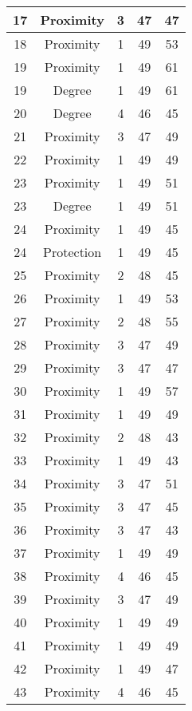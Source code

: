 \documentclass[results.tex]{subfiles}
\begin{document}
\begin{center}
\begin{tabular}{| c || c | c | c | c |}
    17 & Proximity & 3 & 47 & 47 \\ 
    \hline
    18 & Proximity & 1 & 49 & 53 \\ 
    \hline
    19 & Proximity & 1 & 49 & 61 \\ 
    \hline
    19 & Degree & 1 & 49 & 61 \\ 
    \hline
    20 & Degree & 4 & 46 & 45 \\ 
    \hline
    21 & Proximity & 3 & 47 & 49 \\ 
    \hline
    22 & Proximity & 1 & 49 & 49 \\ 
    \hline
    23 & Proximity & 1 & 49 & 51 \\ 
    \hline
    23 & Degree & 1 & 49 & 51 \\ 
    \hline
    24 & Proximity & 1 & 49 & 45 \\ 
    \hline
    24 & Protection & 1 & 49 & 45 \\ 
    \hline
    25 & Proximity & 2 & 48 & 45 \\ 
    \hline
    26 & Proximity & 1 & 49 & 53 \\ 
    \hline
    27 & Proximity & 2 & 48 & 55 \\ 
    \hline
    28 & Proximity & 3 & 47 & 49 \\ 
    \hline
    29 & Proximity & 3 & 47 & 47 \\ 
    \hline
    30 & Proximity & 1 & 49 & 57 \\ 
    \hline
    31 & Proximity & 1 & 49 & 49 \\ 
    \hline
    32 & Proximity & 2 & 48 & 43 \\ 
    \hline
    33 & Proximity & 1 & 49 & 43 \\ 
    \hline
    34 & Proximity & 3 & 47 & 51 \\ 
    \hline
    35 & Proximity & 3 & 47 & 45 \\ 
    \hline
    36 & Proximity & 3 & 47 & 43 \\ 
    \hline
    37 & Proximity & 1 & 49 & 49 \\ 
    \hline
    38 & Proximity & 4 & 46 & 45 \\ 
    \hline
    39 & Proximity & 3 & 47 & 49 \\ 
    \hline
    40 & Proximity & 1 & 49 & 49 \\ 
    \hline
    41 & Proximity & 1 & 49 & 49 \\ 
    \hline
    42 & Proximity & 1 & 49 & 47 \\ 
    \hline
    43 & Proximity & 4 & 46 & 45 \\ 

\end{tabular}
\end{center}
\end{document}

